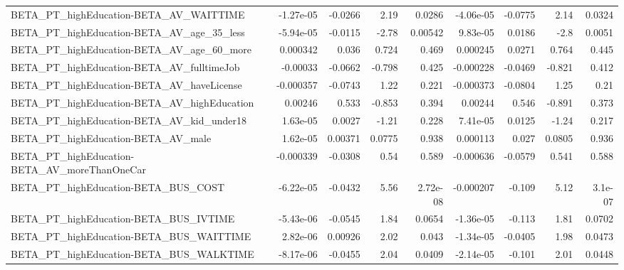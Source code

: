 \begin{tabular}{lrrrrrrrr}
BETA\_PT\_highEducation-BETA\_AV\_WAITTIME             &   -1.27e-05 &      -0.0266 &     2.19 &   0.0286 &  -4.06e-05 &     -0.0775 &         2.14 &        0.0324 \\
BETA\_PT\_highEducation-BETA\_AV\_age\_35\_less          &   -5.94e-05 &      -0.0115 &    -2.78 &  0.00542 &   9.83e-05 &      0.0186 &         -2.8 &        0.0051 \\
BETA\_PT\_highEducation-BETA\_AV\_age\_60\_more          &    0.000342 &        0.036 &    0.724 &    0.469 &   0.000245 &      0.0271 &        0.764 &         0.445 \\
BETA\_PT\_highEducation-BETA\_AV\_fulltimeJob          &    -0.00033 &      -0.0662 &   -0.798 &    0.425 &  -0.000228 &     -0.0469 &       -0.821 &         0.412 \\
BETA\_PT\_highEducation-BETA\_AV\_haveLicense          &   -0.000357 &      -0.0743 &     1.22 &    0.221 &  -0.000373 &     -0.0804 &         1.25 &          0.21 \\
BETA\_PT\_highEducation-BETA\_AV\_highEducation        &     0.00246 &        0.533 &   -0.853 &    0.394 &    0.00244 &       0.546 &       -0.891 &         0.373 \\
BETA\_PT\_highEducation-BETA\_AV\_kid\_under18          &    1.63e-05 &       0.0027 &    -1.21 &    0.228 &   7.41e-05 &      0.0125 &        -1.24 &         0.217 \\
BETA\_PT\_highEducation-BETA\_AV\_male                 &    1.62e-05 &      0.00371 &   0.0775 &    0.938 &   0.000113 &       0.027 &       0.0805 &         0.936 \\
BETA\_PT\_highEducation-BETA\_AV\_moreThanOneCar       &   -0.000339 &      -0.0308 &     0.54 &    0.589 &  -0.000636 &     -0.0579 &        0.541 &         0.588 \\
BETA\_PT\_highEducation-BETA\_BUS\_COST                &   -6.22e-05 &      -0.0432 &     5.56 & 2.72e-08 &  -0.000207 &      -0.109 &         5.12 &       3.1e-07 \\
BETA\_PT\_highEducation-BETA\_BUS\_IVTIME              &   -5.43e-06 &      -0.0545 &     1.84 &   0.0654 &  -1.36e-05 &      -0.113 &         1.81 &        0.0702 \\
BETA\_PT\_highEducation-BETA\_BUS\_WAITTIME            &    2.82e-06 &      0.00926 &     2.02 &    0.043 &  -1.34e-05 &     -0.0405 &         1.98 &        0.0473 \\
BETA\_PT\_highEducation-BETA\_BUS\_WALKTIME            &   -8.17e-06 &      -0.0455 &     2.04 &   0.0409 &  -2.14e-05 &      -0.101 &         2.01 &        0.0448 \\

\end{tabular}
